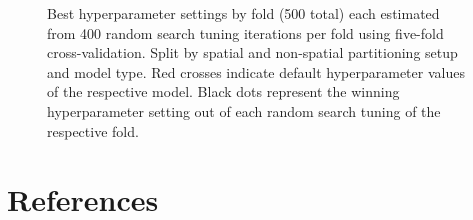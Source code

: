 \documentclass[review]{elsarticle}
\begin{document}
\begin{figure} [h]
	\begin{center}
		\caption[]{Best hyperparameter settings by fold (500 total) each estimated from 400 random search tuning iterations per fold using five-fold cross-validation.
			Split by spatial and non-spatial partitioning setup and model type.
			Red crosses indicate default hyperparameter values of the respective model.
			Black dots represent the winning hyperparameter setting out of each random search tuning of the respective fold.}
		\label{fig:best_parameter_combs_app}
	\end{center}
\end{figure}

\FloatBarrier

\pagebreak

\section*{References}


\end{document}
